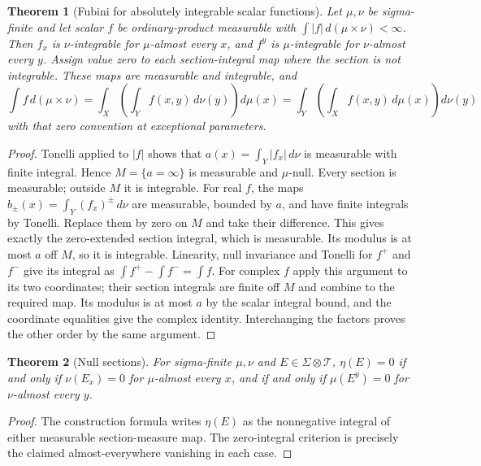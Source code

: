 \documentclass[11pt,oneside,openany]{book}
\newtheorem{theorem}{Theorem}[chapter]
\theoremstyle{definition}
\theoremstyle{remark}
\newcommand{\family}[1]{}
\begin{document}
\begin{theorem}[Fubini for absolutely integrable scalar functions]
\family{D11.08.fubini}\label{d11:08:fubini}
Let $\mu,\nu$ be sigma-finite and let scalar $f$ be ordinary-product
measurable with $\int|f|\,d(\mu\times\nu)<\infty$.
Then $f_x$ is $\nu$-integrable for $\mu$-almost every $x$, and $f^y$ is
$\mu$-integrable for $\nu$-almost every $y$. Assign value zero to each
section-integral map where the section is not integrable. These maps are
measurable and integrable, and
\[
 \int f\,d(\mu\times\nu)
 =\int_X\left(\int_Y f(x,y)\,d\nu(y)\right)d\mu(x)
 =\int_Y\left(\int_X f(x,y)\,d\mu(x)\right)d\nu(y)
\]
with that zero convention at exceptional parameters.
\end{theorem}
\begin{proof}
Tonelli applied to $|f|$ shows that
$a(x)=\int_Y|f_x|\,d\nu$ is measurable with finite integral. Hence
$M=\{a=\infty\}$ is measurable and $\mu$-null. Every section is
measurable; outside $M$ it is integrable. For real $f$, the maps
$b_\pm(x)=\int_Y(f_x)^\pm\,d\nu$ are measurable, bounded by $a$, and
have finite integrals by Tonelli. Replace them by zero on $M$ and take
their difference. This gives exactly the zero-extended section integral,
which is measurable. Its modulus is at most $a$ off $M$, so it is
integrable. Linearity, null invariance and Tonelli for $f^+$ and $f^-$
give its integral as $\int f^+-\int f^-=\int f$.
For complex $f$ apply this argument to its two coordinates; their
section integrals are finite off $M$ and combine to the required map.
Its modulus is at most $a$ by the scalar integral bound, and the
coordinate equalities give the complex identity. Interchanging the
factors proves the other order by the same argument.
\end{proof}

\begin{theorem}[Null sections]
\family{D11.08.null_sections}\label{d11:08:null-sections}
For sigma-finite $\mu,\nu$ and $E\in\Sigma\otimes\mathcal T$,
$\eta(E)=0$ if and only if $\nu(E_x)=0$ for $\mu$-almost every $x$,
and if and only if $\mu(E^y)=0$ for $\nu$-almost every $y$.
\end{theorem}
\begin{proof}
The construction formula writes $\eta(E)$ as the nonnegative integral
of either measurable section-measure map. The zero-integral criterion
is precisely the claimed almost-everywhere vanishing in each case.
\end{proof}
\end{document}
